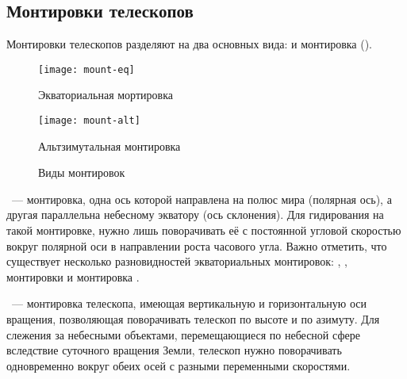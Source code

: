 \subsection{Монтировки телескопов}
Монтировки телескопов разделяют на два основных вида:  и  монтировка ().
\begin{figure}[h]
    \centering
    \hspace*{.4cm}
    \begin{subcaptionblock}{0.48\textwidth}
        \texttt{[image: mount-eq]}
        \caption{Экваториальная мортировка}
    \end{subcaptionblock}
    \hspace*{.4cm}
    \begin{subcaptionblock}{0.41\textwidth}
        \texttt{[image: mount-alt]}
        \caption{Альтзимутальная монтировка}
    \end{subcaptionblock}
    \hspace*{.4cm}
    \caption{Виды монтировок}
    \label{mounts}
\end{figure}

~--- монтировка, одна ось которой направлена на полюс мира (полярная ось), а другая параллельна небесному экватору (ось склонения).
Для гидирования на такой монтировке, нужно лишь поворачивать её с постоянной угловой скоростью вокруг полярной оси в направлении роста часового угла.
Важно отметить, что существует несколько разновидностей экваториальных монтировок: , ,  монтировки и монтировка .

~--- монтировка телескопа, имеющая вертикальную и горизонтальную оси вращения, позволяющая поворачивать телескоп по высоте и по азимуту. Для слежения за небесными объектами, перемещающиеся по небесной сфере вследствие суточного вращения Земли, телескоп нужно поворачивать одновременно вокруг обеих осей с разными переменными скоростями.
